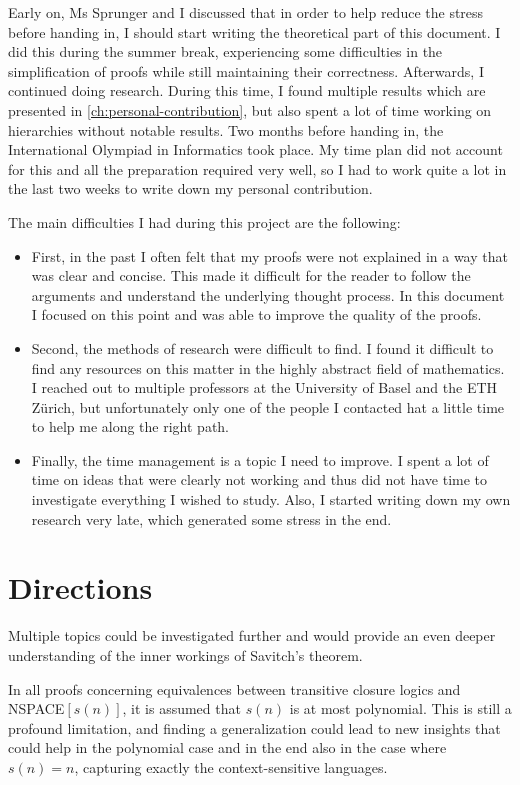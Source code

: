 Early on, Ms Sprunger and I discussed that in order to help reduce the stress before handing in, I should start writing the theoretical part of this document.
I did this during the summer break, experiencing some difficulties in the simplification of proofs while still maintaining their correctness.
Afterwards, I continued doing research.
During this time, I found multiple results which are presented in \cref{ch:personal-contribution}, but also spent a lot of time working on hierarchies without notable results.
Two months before handing in, the International Olympiad in Informatics took place.
My time plan did not account for this and all the preparation required very well, so I had to work quite a lot in the last two weeks to write down my personal contribution.

The main difficulties I had during this project are the following:
\begin{itemize}
    \setlength\itemsep{0.15em}
    \item First, in the past I often felt that my proofs were not explained in a way that was clear and concise.
    This made it difficult for the reader to follow the arguments and understand the underlying thought process.
    In this document I focused on this point and was able to improve the quality of the proofs.
    \item Second, the methods of research were difficult to find.
    I found it difficult to find any resources on this matter in the highly abstract field of mathematics.
    I reached out to multiple professors at the University of Basel and the ETH Zürich, but unfortunately only one of the people I contacted hat a little time to help me along the right path.
    \item Finally, the time management is a topic I need to improve.
    I spent a lot of time on ideas that were clearly not working and thus did not have time to investigate everything I wished to study.
    Also, I started writing down my own research very late, which generated some stress in the end.
\end{itemize}

\section{Directions}\label{sec:directions}
Multiple topics could be investigated further and would provide an even deeper understanding of the inner workings of Savitch's theorem.

In all proofs concerning equivalences between transitive closure logics and \acs{NSPACE}$[s(n)]$, it is assumed that $s(n)$ is at most polynomial.
This is still a profound limitation, and finding a generalization could lead to new insights that could help in the polynomial case and in the end also in the case where $s(n) = n$, capturing exactly the context-sensitive languages.

